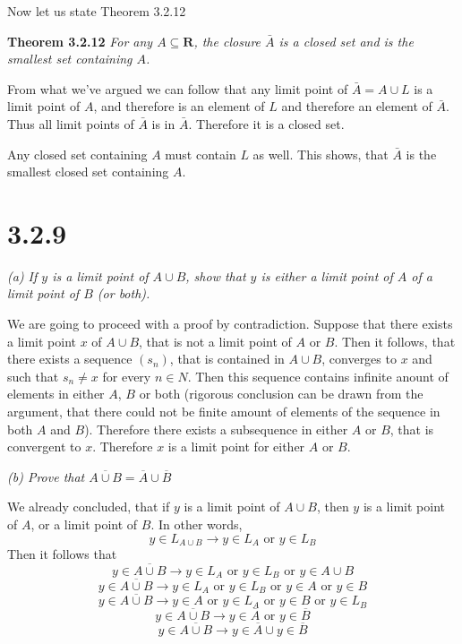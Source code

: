 \documentclass[11pt,oneside,titlepage]{article}
\begin{document}
Now let us state Theorem 3.2.12

\textbf{Theorem 3.2.12} \textit{For any $A \subseteq \textbf{R}$, the closure
  $\bar{A}$ is a closed set and is the smallest set containing $A$.}

From what we've argued we can follow that any limit point of $\bar A = A \cup L$
is a limit point of $A$, and therefore is an element of $L$ and therefore an
element of $\bar{A}$.  Thus all limit points of $\bar A$ is in $\bar A$. Therefore
it is a closed set.

Any closed set containing $A$ must contain $L$ as well. This shows, that $\bar A$
is the smallest closed set containing $A$.

\section*{3.2.9}

\textit{(a) If $y$ is a limit point of $A \cup B$, show that $y$ is either a limit
  point of $A$ of a limit point of $B$ (or both).}


We are going to proceed with a proof by contradiction. Suppose that there exists a
limit point $x$ of $A \cup B$, that is not a limit point of $A$ or $B$. Then it
follows, that there exists a sequence $(s_n)$, that is contained in $A \cup B$,
converges to $x$ and such that $s_n \neq x$ for every $n \in N$. Then this
sequence contains infinite anount of elements in either $A$, $B$ or both
(rigorous conclusion can be drawn from the argument, that there could not
be finite amount of elements of the sequence in both $A$ and $B$).
Therefore there exists a subsequence in either $A$ or $B$, that is convergent to
$x$. Therefore $x$ is a limit point for either $A$ or $B$.

\textit{(b) Prove that $\overline{A \cup B} = \overline A \cup \overline B$}

We already concluded, that if $y$ is a limit point of $A \cup B$, then $y$ is a limit point
of $A$, or a limit point of $B$. In other words,
$$y \in L_{A\cup B} \to y \in L_A \text{ or } y \in L_B$$
Then it follows that
$$y \in \overline{A\cup B} \to y \in L_A \text{ or } y \in L_B \text{ or } y \in A \cup B$$
$$y \in \overline{A\cup B} \to y \in L_A \text{ or } y \in L_B \text{ or } y \in A
\text{ or } y \in B$$
$$y \in \overline{A\cup B} \to   y \in A \text{ or }  y \in L_A 
\text{ or } y \in B \text{ or }  y \in L_B$$
$$y \in \overline{A\cup B} \to   y \in \overline A
\text{ or } y \in \overline B $$
$$y \in \overline{A\cup B} \to   y \in \overline A
\cup y \in \overline B $$
\end{document}
